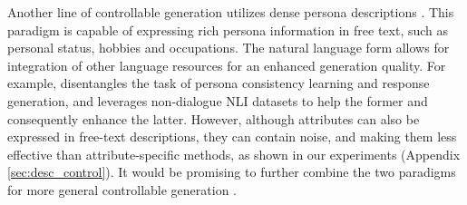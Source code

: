 Another line of controllable generation utilizes dense persona descriptions \citep{zhang2018personalizing}. This paradigm is capable of expressing rich persona information in free text, such as personal status, hobbies and occupations. The natural language form allows for integration of other language resources for an enhanced generation quality. For example, \citet{song2021bob} disentangles the task of persona consistency learning and response generation, and leverages non-dialogue NLI datasets to help the former and consequently enhance the latter. However, although attributes can also be expressed in free-text descriptions, they can contain noise, and making them less effective than attribute-specific methods, as shown in our experiments (Appendix \ref{sec:desc_control}). It would be promising to further combine the two paradigms for more general controllable generation \citep{tang2023enhancing}.